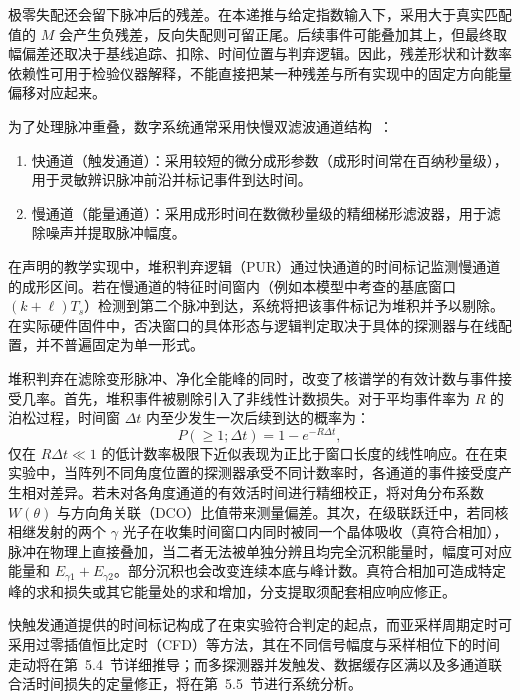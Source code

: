 极零失配还会留下脉冲后的残差。在本递推与给定指数输入下，采用大于真实匹配值的 $M$ 会产生负残差，反向失配则可留正尾。后续事件可能叠加其上，但最终取幅偏差还取决于基线追踪、扣除、时间位置与判弃逻辑。因此，残差形状和计数率依赖性可用于检验仪器解释，不能直接把某一种残差与所有实现中的固定方向能量偏移对应起来。

为了处理脉冲重叠，数字系统通常采用快慢双滤波通道结构~\cite{wu-hongyi-2020-general-purpose-digital-daq-thesis, wu-2021-general-purpose-digital-daq-waveform-analysis}：
\begin{enumerate}
\item 快通道（触发通道）：采用较短的微分成形参数（成形时间常在百纳秒量级），用于灵敏辨识脉冲前沿并标记事件到达时间。
\item 慢通道（能量通道）：采用成形时间在数微秒量级的精细梯形滤波器，用于滤除噪声并提取脉冲幅度。
\end{enumerate}
在声明的教学实现中，堆积判弃逻辑（PUR）通过快通道的时间标记监测慢通道的成形区间。若在慢通道的特征时间窗内（例如本模型中考查的基底窗口 $(k + \ell) T_s$）检测到第二个脉冲到达，系统将把该事件标记为堆积并予以剔除。在实际硬件固件中，否决窗口的具体形态与逻辑判定取决于具体的探测器与在线配置，并不普遍固定为单一形式。

堆积判弃在滤除变形脉冲、净化全能峰的同时，改变了核谱学的有效计数与事件接受几率。首先，堆积事件被剔除引入了非线性计数损失。对于平均事件率为 $R$ 的泊松过程，时间窗 $\Delta t$ 内至少发生一次后续到达的概率为：
\begin{equation}\label{eq:5-3-pur-poisson}
P(\ge 1; \Delta t) = 1 - e^{-R \Delta t},
\end{equation}
仅在 $R \Delta t \ll 1$ 的低计数率极限下近似表现为正比于窗口长度的线性响应。在在束实验中，当阵列不同角度位置的探测器承受不同计数率时，各通道的事件接受度产生相对差异。若未对各角度通道的有效活时间进行精细校正，将对角分布系数 $W(\theta)$ 与方向角关联（DCO）比值带来测量偏差。其次，在级联跃迁中，若同核相继发射的两个 $\gamma$ 光子在收集时间窗口内同时被同一个晶体吸收（真符合相加），脉冲在物理上直接叠加，当二者无法被单独分辨且均完全沉积能量时，幅度可对应能量和 $E_{\gamma 1}+E_{\gamma 2}$。部分沉积也会改变连续本底与峰计数。真符合相加可造成特定峰的求和损失或其它能量处的求和增加，分支提取须配套相应响应修正。

快触发通道提供的时间标记构成了在束实验符合判定的起点，而亚采样周期定时可采用过零插值恒比定时（CFD）等方法，其在不同信号幅度与采样相位下的时间走动将在第~5.4~节详细推导；而多探测器并发触发、数据缓存区满以及多通道联合活时间损失的定量修正，将在第~5.5~节进行系统分析。
